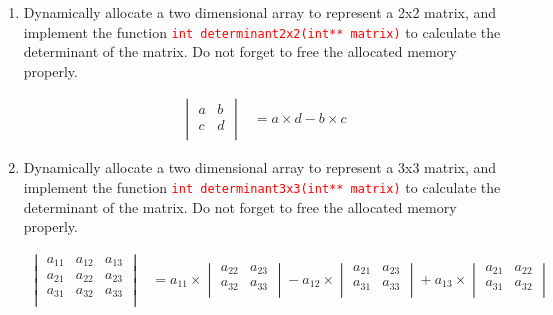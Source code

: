 \documentclass[12pt]{article}
\begin{document}
\begin{enumerate}
    \item Dynamically allocate a two dimensional array to represent a 2x2 matrix, and implement the function 
    \textcolor{red}{\texttt{int determinant2x2(int** matrix)}} to calculate the determinant of the matrix. Do not 
    forget to free the allocated memory properly.

    \begin{align*}
        \begin{vmatrix}
            a & b \\
            c & d \\
        \end{vmatrix} &= a \times d - b \times c
    \end{align*}

    \item Dynamically allocate a two dimensional array to represent a 3x3 matrix, and implement the function 
    \textcolor{red}{\texttt{int determinant3x3(int** matrix)}} to calculate the determinant of the matrix. Do not 
    forget to free the allocated memory properly.

    \begin{align*}
        \begin{vmatrix}
            a_{11} & a_{12} & a_{13} \\
            a_{21} & a_{22} & a_{23} \\
            a_{31} & a_{32} & a_{33} \\
        \end{vmatrix} &= a_{11} \times 
            \begin{vmatrix}
                a_{22} & a_{23} \\  
                a_{32} & a_{33} \\  
            \end{vmatrix} - a_{12} \times 
            \begin{vmatrix}
                a_{21} & a_{23} \\  
                a_{31} & a_{33} \\ 
            \end{vmatrix} + a_{13} \times 
            \begin{vmatrix}
                a_{21} & a_{22} \\  
                a_{31} & a_{32} \\
            \end{vmatrix}
    \end{align*}




\end{enumerate}
\end{document}
